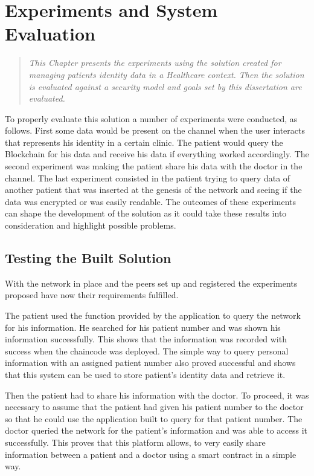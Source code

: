 \chapter{Experiments and System Evaluation} 
\label{experiments}

\begin{quote}
\emph{This Chapter presents the experiments using the solution created for
  managing patients identity data in a Healthcare context. Then the solution is
  evaluated against a security model and goals set by this dissertation are
  evaluated.}
\end{quote}

To properly evaluate this solution a number of experiments were conducted, as
follows. First some data would be present on the channel when the user
interacts that represents his identity in a certain clinic. The patient would
query the Blockchain for his data and receive his data if everything worked
accordingly. The second experiment was making the patient share his data with
the doctor in the channel. The last experiment consisted in the patient trying
to query data of another patient that was inserted at the genesis of the
network and seeing if the data was encrypted or was easily readable. The
outcomes of these experiments can shape the development of the solution as it
could take these results into consideration and highlight possible problems.

\section{Testing the Built Solution}\label{tests}

With the network in place and the peers set up and registered the experiments
proposed have now their requirements fulfilled.

The patient used the function provided by the application to query the network
for his information. He searched for his patient number and was shown his
information successfully. This shows that the information was recorded with
success when the chaincode was deployed. The simple way to query personal
information with an assigned patient number also proved successful and shows
that this system can be used to store patient's identity data and retrieve it.

Then the patient had to share his information with the doctor. To proceed, it
was necessary to assume that the patient had given his patient number to the
doctor so that he could use the application built to query for that patient
number. The doctor queried the network for the patient's information and was
able to access it successfully. This proves that this platform allows, to very
easily share information between a patient and a doctor using a smart contract
in a simple way.

